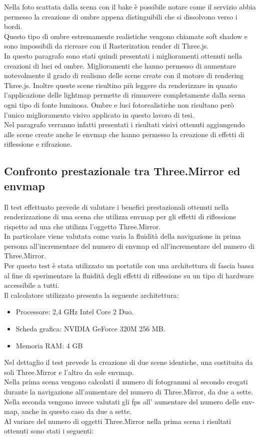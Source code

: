 Nella foto scattata dalla scena con il bake è possibile notare come il servizio abbia permesso la creazione di ombre appena distinguibili che si dissolvono verso i bordi. 
\\
Questo tipo di ombre estremamente realistiche vengono chiamate soft shadow e sono impossibili da ricreare con il Rasterization render di Three.js. 
\\
In questo paragrafo sono stati quindi presentati i miglioramenti ottenuti nella creazioni di luci ed ombre. Miglioramenti che hanno permesso di aumentare notevolmente il grado di realismo delle scene create con il motore di rendering Three.js.
Inoltre queste scene risultino più leggere da renderizzare in quanto l’applicazione delle lightmap permette di rimuovere completamente dalla scena ogni tipo di fonte luminosa.
Ombre e luci fotorealistiche non risultano però l’unico miglioramento visivo applicato in questo lavoro di tesi.
\\
Nel paragrafo \label{sec:chapter_prove_sperimentali_qualita_visiva} verranno infatti presentati i risultati visivi ottenuti aggiungendo alle scene create anche le envmap che hanno permesso la creazione di effetti di riflessione e rifrazione.

\subsection{Confronto prestazionale tra Three.Mirror ed envmap}
Il test effettuato prevede di valutare i benefici prestazionali ottenuti nella renderizzazione di una scena che utilizza envmap per gli effetti di riflessione rispetto ad una che utilizza l’oggetto Three.Mirror.
\\
In particolare viene valutata come varia la fluidità della navigazione in prima persona all’incrementare del numero di envmap ed all’incrementare del numero di Three.Mirror.
\\
Per questo test è stata utilizzato un portatile con una architettura di fascia bassa al fine di sperimentare la fluidità degli effetti di riflessione su un tipo di hardware accessibile a tutti.
\\
Il calcolatore utilizzato presenta la seguente architettura:
\begin{itemize}
\item Processore: 2,4 GHz Intel Core 2 Duo.
\item Scheda grafica: NVIDIA GeForce 320M 256 MB.
\item Memoria RAM: 4 GB
\end{itemize}
Nel dettaglio il test prevede la creazione di due scene identiche, una costituita da soli Three.Mirror e l’altro da sole envmap.
\\
Nella prima scena vengono calcolati il numero di fotogrammi al secondo erogati durante la navigazione all’aumentare del numero di Three.Mirror, da due a sette.
\\
Nella seconda vengono invece valutati gli fps all’ aumentare del numero delle env-map, anche in questo caso da due a sette.
\\
Al variare del numero di oggetti Three.Mirror nella prima scena i risultati ottenuti sono stati i seguenti:

